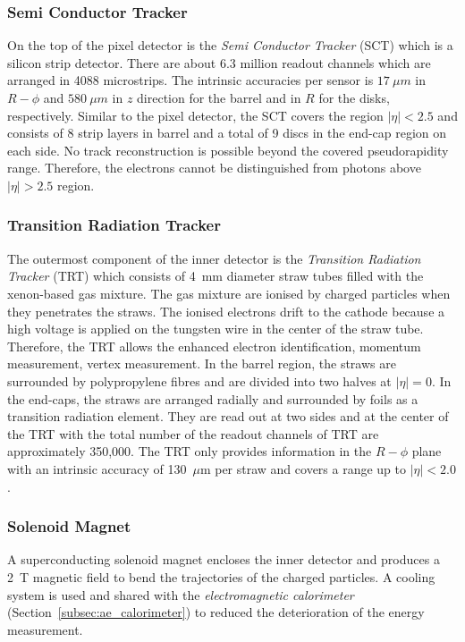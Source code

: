 
\subsubsection{Semi Conductor Tracker}
\label{subsubsec:ae_sct}
On the top of the pixel detector is the \textit{Semi Conductor Tracker} (SCT) which is a silicon strip detector.
There are about 6.3 million readout channels which are arranged in 4088 microstrips.
The intrinsic accuracies per sensor is $17~\mu m$ in $R-\phi$ and $580~\mu m$ in $z$ direction for the barrel and in $R$ for the  disks, respectively.
Similar to the pixel detector, the SCT covers the region $|\eta| < 2.5$ and consists of 8 strip layers in barrel and a total of 9 discs in the end-cap region on each side.
No track reconstruction is possible beyond the covered pseudorapidity range.
Therefore, the electrons cannot be distinguished from photons above $|\eta| > 2.5$ region.


\subsubsection{Transition Radiation Tracker}
\label{subsubsec:ae_trt}
The outermost component of the inner detector is the \textit{Transition Radiation Tracker} (TRT) which consists of 4~mm diameter straw tubes filled with the xenon-based gas mixture.
The gas mixture are ionised by charged particles when they penetrates the straws.
The ionised electrons drift to the cathode because a high voltage is applied on the tungsten wire in the center of the straw tube.
Therefore, the TRT allows the enhanced electron identification, momentum measurement, vertex measurement.
In the barrel region, the straws are surrounded by polypropylene fibres and are divided into two halves at $|\eta|=0$.
In the end-caps, the straws are arranged radially and surrounded by foils as a transition radiation element.
They are read out at two sides and at the center of the TRT with the total number of the readout channels of TRT are approximately 350,000.
The TRT only provides information in the $R-\phi$ plane with an intrinsic accuracy of 130~$\mu$m per straw and covers a range up to $|\eta| < 2.0$. 


\subsubsection{Solenoid Magnet}
\label{subsubsec:ae_magnetic}
A superconducting solenoid magnet encloses the inner detector and produces a 2~T magnetic field to bend the trajectories of the charged particles.
A cooling system is used and shared with the \textit{electromagnetic calorimeter} (Section~\ref{subsec:ae_calorimeter}) to reduced the deterioration of the energy measurement.

